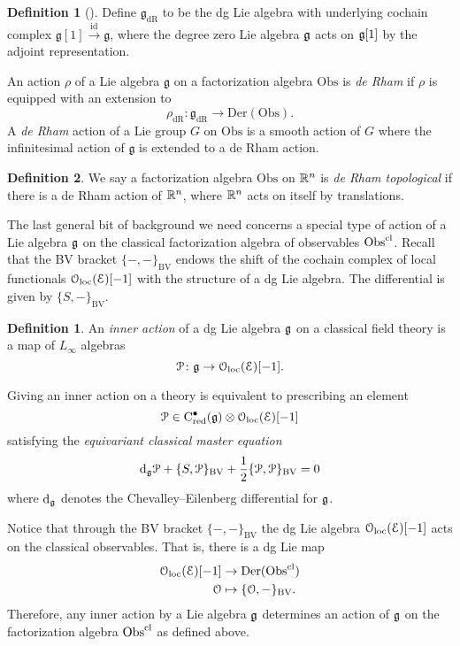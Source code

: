 \documentclass[11pt, oneside, reqno]{amsart}
\theoremstyle{definition} \newtheorem{definition}{Definition}[section]
\theoremstyle{definition}
\newtheorem{dfn}[thm]{Definition}
\theoremstyle{remark}
\theoremstyle{definition} \newtheorem{remark}[definition]{Remark}
\theoremstyle{definition} \newtheorem{remarks}[definition]{Remarks}
\theoremstyle{definition} \newtheorem{question}[definition]{Question}
\theoremstyle{definition} \newtheorem*{note}{Note}
\theoremstyle{definition} \newtheorem{example}[definition]{Example}
\theoremstyle{definition} \newtheorem{examples}[definition]{Examples}
\def\oloc{\mathcal{O}_{\rm loc}}
\def\bu{\bullet}
\def\cE{\mathcal E}\def\cF{\mathcal F}\def\cG{\mathcal G}\def\cH{\mathcal H}
\renewcommand{\gg}{\mathfrak{g}}
\newcommand{\mr}[1]{\mathrm{#1}}
\newcommand{\mc}[1]{\mathcal{#1}}
\def\d{{\rm d}}
\newcommand{\Obs}{\mathrm{Obs}}
\newcommand{\obs}{\mathrm{Obs}}
\begin{document}
\begin{definition}[{\cite[Definition 2.18]{ElliottSafronov}}] \label{dR_action_def}
Define $\gg_{\mr{dR}}$ to be the dg Lie algebra with underlying cochain complex $\gg[1] \overset {\mr{id}} \to \gg$, where the degree zero Lie algebra $\mathfrak g$ acts on $\mathfrak g[1]$ by the adjoint representation. 

An action $\rho$ of a Lie algebra $\gg$ on a factorization algebra $\obs$ is \emph{de Rham} if $\rho$ is equipped with an extension to
\[\rho_{\mr{dR}} \colon \gg_{\mr{dR}} \to \mr{Der}(\obs).\]
A \emph{de Rham} action of a Lie group $G$ on $\obs$ is a smooth action of $G$ where the infinitesimal action of $\gg$ is extended to a de Rham action.
\end{definition}

\begin{definition}
We say a factorization algebra $\obs$ on $\mathbb R^n$ is \emph{de Rham topological} if there is a de Rham action of $\mathbb R^n$, where $\mathbb R^n$ acts on itself by translations.
\end{definition}

The last general bit of background we need concerns a special type of action of a Lie algebra $\mathfrak g$ on the classical factorization algebra of observables $\Obs^{\rm cl}$. 
Recall that the BV bracket $\{-,-\}_{\mr{BV}}$ endows the shift of the cochain complex of local functionals $\oloc(\cE)[-1]$ with the structure of a dg Lie algebra.
The differential is given by $\{S,-\}_{\mr{BV}}$. 

\begin{dfn}
An \emph{inner action} of a dg Lie algebra $\mathfrak g$ on a classical field theory is a map of $L_\infty$ algebras
\[
\cP \colon \fg \to \oloc(\cE)[-1] .
\]
\end{dfn}

Giving an inner action on a theory is equivalent to prescribing an element
\[
\cP \in {\rm C}_{\rm red}^\bu(\fg) \otimes \oloc(\cE)[-1]
\]
satisfying the {\em equivariant classical master equation}
\begin{equation}\label{eqn:equivcme}
\d_{\fg} \cP + \{S, \cP\}_{\mr{BV}} + \frac{1}{2} \{\cP, \cP\}_{\mr{BV}} = 0
\end{equation}
where $\d_{\fg}$ denotes the Chevalley--Eilenberg differential for $\mathfrak g$. 

Notice that through the BV bracket $\{-,-\}_{\mr{BV}}$ the dg Lie algebra $\oloc(\cE)[-1]$ acts on the classical observables.  That is, there is a dg Lie map
\begin{align*}
\oloc(\cE)[-1] &\to {\rm Der}(\Obs^{\rm cl}) \\
\mc O &\mapsto \{\mc O, -\}_{\mr{BV}}.
\end{align*}
Therefore, any inner action by a Lie algebra $\mathfrak g$ determines an action of $\mathfrak g$ on the factorization algebra $\Obs^{\rm cl}$ as defined above.
\end{document}
